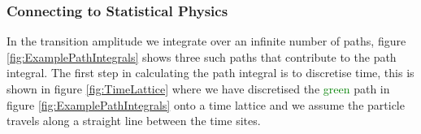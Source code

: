 \documentclass[12pt]{article}
\begin{document}
        \subsubsection{Connecting to Statistical Physics}
        In the transition amplitude we integrate over an infinite number of paths, figure \ref{fig:ExamplePathIntegrals} shows three such paths that contribute to the path integral. The first step in calculating the path integral is to discretise time, this is shown in figure \ref{fig:TimeLattice} where we have discretised the \textcolor{green}{green} path in figure \ref{fig:ExamplePathIntegrals} onto a time lattice and we assume the particle travels along a straight line between the time sites.
        \begin{figure}
            \centering
            \begin{tikzpicture}[scale=0.5, every node/.style={transform shape}]
                

\end{tikzpicture}
\end{figure}
\end{document}
